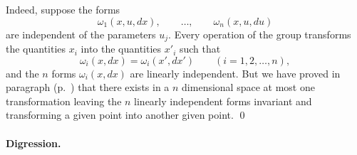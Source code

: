 \somespace

Indeed, suppose the forms
\[
\omega_{1}(x,u,dx),\qquad\dots,\qquad \omega_{n}(x,u,du)
\]
are independent of the parameters $u_{j}$. Every operation of the group transforms the quantities $x_{i}$ into the quantities $x'_{i}$ such that
\[
\omega_{i}(x,dx)=\omega_{i}(x',dx')\qquad(i=1,2,\dots,n),
\]
and the $n$ forms $\omega_{i}(x,dx)$ are linearly independent. But we have proved in paragraph  (p.~\pageref{sec:83}) that there exists in a $n$ dimensional space at most one transformation leaving the $n$ linearly independent forms invariant and transforming a given point into another given point.
\qed

\paragraph{Digression.}
\label{sec:111}
